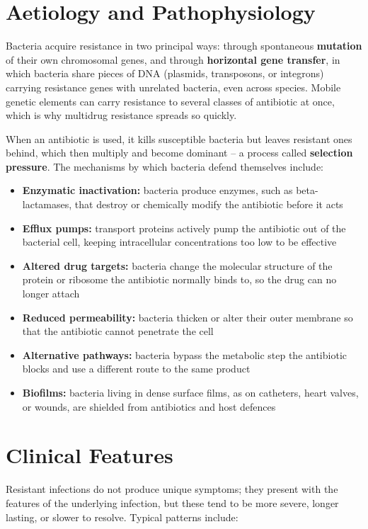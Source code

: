 \section*{Aetiology and Pathophysiology}
Bacteria acquire resistance in two principal ways: through spontaneous \textbf{mutation} of their own chromosomal genes, and through \textbf{horizontal gene transfer}, in which bacteria share pieces of DNA (plasmids, transposons, or integrons) carrying resistance genes with unrelated bacteria, even across species. Mobile genetic elements can carry resistance to several classes of antibiotic at once, which is why multidrug resistance spreads so quickly.

When an antibiotic is used, it kills susceptible bacteria but leaves resistant ones behind, which then multiply and become dominant -- a process called \textbf{selection pressure}. The mechanisms by which bacteria defend themselves include:

\begin{itemize}
    \item \textbf{Enzymatic inactivation:} bacteria produce enzymes, such as beta-lactamases, that destroy or chemically modify the antibiotic before it acts
    \item \textbf{Efflux pumps:} transport proteins actively pump the antibiotic out of the bacterial cell, keeping intracellular concentrations too low to be effective
    \item \textbf{Altered drug targets:} bacteria change the molecular structure of the protein or ribosome the antibiotic normally binds to, so the drug can no longer attach
    \item \textbf{Reduced permeability:} bacteria thicken or alter their outer membrane so that the antibiotic cannot penetrate the cell
    \item \textbf{Alternative pathways:} bacteria bypass the metabolic step the antibiotic blocks and use a different route to the same product
    \item \textbf{Biofilms:} bacteria living in dense surface films, as on catheters, heart valves, or wounds, are shielded from antibiotics and host defences
\end{itemize}

\section*{Clinical Features}
Resistant infections do not produce unique symptoms; they present with the features of the underlying infection, but these tend to be more severe, longer lasting, or slower to resolve. Typical patterns include:

